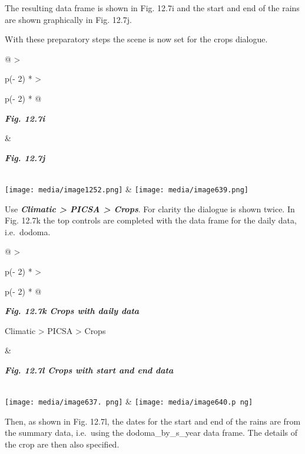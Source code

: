 \documentclass[
  letterpaper,
  DIV=11,
  numbers=noendperiod]{scrreprt}
\begin{document}
The resulting data frame is shown in Fig. 12.7i and the start and end of
the rains are shown graphically in Fig. 12.7j.

With these preparatory steps the scene is now set for the crops
dialogue.

\begin{longtable}[]{@{}
  >{\raggedright\arraybackslash}p{(\columnwidth - 2\tabcolsep) * }
  >{\raggedright\arraybackslash}p{(\columnwidth - 2\tabcolsep) * }@{}}
\toprule\noalign{}
\begin{minipage}[b]{\linewidth}\raggedright
\textbf{\emph{Fig. 12.7i}}
\end{minipage} & \begin{minipage}[b]{\linewidth}\raggedright
\textbf{\emph{Fig. 12.7j}}
\end{minipage} \\
\midrule\noalign{}
\endhead
\bottomrule\noalign{}
\endlastfoot
\texttt{[image: media/image1252.png]}
&
\texttt{[image: media/image639.png]} \\
\end{longtable}

Use \textbf{\emph{Climatic \textgreater{} PICSA \textgreater{} Crops}}.
For clarity the dialogue is shown twice. In Fig. 12.7k the top controls
are completed with the data frame for the daily data, i.e.~dodoma.

\begin{longtable}[]{@{}
  >{\raggedright\arraybackslash}p{(\columnwidth - 2\tabcolsep) * }
  >{\raggedright\arraybackslash}p{(\columnwidth - 2\tabcolsep) * }@{}}
\toprule\noalign{}
\begin{minipage}[b]{\linewidth}\raggedright
\textbf{\emph{Fig. 12.7k Crops with daily data}}

Climatic \textgreater{} PICSA \textgreater{} Crops
\end{minipage} & \begin{minipage}[b]{\linewidth}\raggedright
\textbf{\emph{Fig. 12.7l Crops with start and end data}}
\end{minipage} \\
\midrule\noalign{}
\endhead
\bottomrule\noalign{}
\endlastfoot
\texttt{[image: media/image637. png]}
&
\texttt{[image: media/image640.p ng]} \\
\end{longtable}

Then, as shown in Fig. 12.7l, the dates for the start and end of the
rains are from the summary data, i.e.~using the dodoma\_by\_s\_year data
frame. The details of the crop are then also specified.
\end{document}
